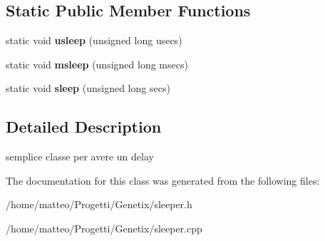 \subsection*{Static Public Member Functions}
\begin{DoxyCompactItemize}
\item 
\mbox{\label{classSleeper_a2990dba95c89499a1164c670159de374}} 
static void {\bfseries usleep} (unsigned long usecs)
\item 
\mbox{\label{classSleeper_a88b12fac40c3963b87ac092799dea043}} 
static void {\bfseries msleep} (unsigned long msecs)
\item 
\mbox{\label{classSleeper_a78d9fd4dfe374ec524960ab32af727b6}} 
static void {\bfseries sleep} (unsigned long secs)
\end{DoxyCompactItemize}


\subsection{Detailed Description}
semplice classe per avere un delay 

The documentation for this class was generated from the following files\+:\begin{DoxyCompactItemize}
\item 
/home/matteo/\+Progetti/\+Genetix/sleeper.\+h\item 
/home/matteo/\+Progetti/\+Genetix/sleeper.\+cpp\end{DoxyCompactItemize}
